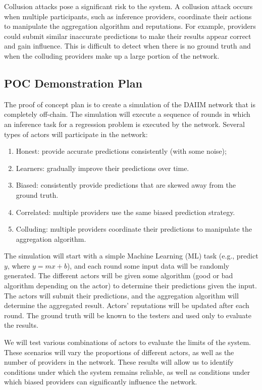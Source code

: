 \documentclass{article}
\begin{document}
Collusion attacks pose a significant risk to the system. A collusion attack
occurs when multiple participants, such as inference providers, coordinate
their actions to manipulate the aggregation algorithm and reputations. For
example, providers could submit similar inaccurate predictions to make their
results appear correct and gain influence. This is
difficult to detect when there is no ground truth and when the colluding
providers make up a large portion of the network.

\subsection{POC Demonstration Plan}

The proof of concept plan is to create a simulation of the DAIIM network that
is completely off-chain. The simulation will execute a sequence of rounds in which
an inference task for a regression problem is executed by the network. Several types of actors will participate in the network:

\begin{enumerate}
    \item Honest: provide accurate predictions consistently (with some noise);
    \item Learners: gradually improve their predictions over time.
    \item Biased: consistently provide predictions that are skewed away from the ground truth.
    \item Correlated: multiple providers use the same biased prediction strategy.
    \item Colluding: multiple providers coordinate their predictions to manipulate the aggregation algorithm.
\end{enumerate}

The simulation will start with a simple Machine Learning (ML) task (e.g., predict $y$, where $y = mx + b$), and each round some input data will be randomly generated.
The different actors will be given some algorithm (good or bad algorithm depending on the actor) to determine their predictions given the input.
The actors will submit their predictions, and the aggregation algorithm will determine the aggregated result. Actors' reputations will be updated after each round. The ground truth will be known to the testers and used only to evaluate the results.

We will test various combinations of actors to evaluate the limits of the
system. These scenarios will vary the proportions of different actors, as well as the number of providers in the
network. These results will allow us to identify conditions under which the system remains reliable, as well as conditions under which biased providers can significantly influence the network.
\end{document}
